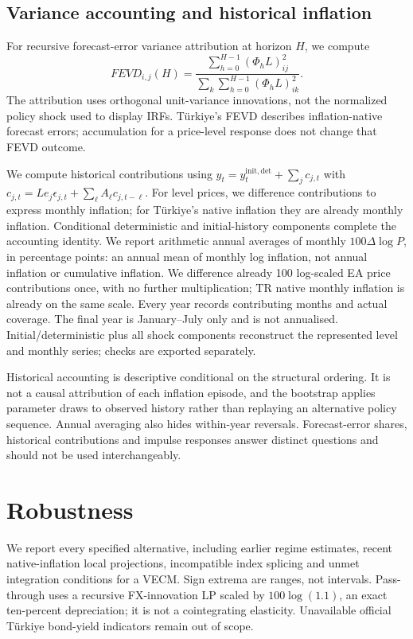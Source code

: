 \subsection{Variance accounting and historical inflation}

For recursive forecast-error variance attribution at horizon $H$, we compute
\begin{equation}
 FEVD_{i, j}(H)=\frac{\sum_{h=0}^{H-1}(\Phi_hL)_{ij}^{2}}{\sum_{k}\sum_{h=0}^{H-1}(\Phi_hL)_{ik}^{2}}.
\end{equation}
The attribution uses orthogonal unit-variance innovations, not the normalized policy shock used to display IRFs. Türkiye's FEVD describes inflation-native forecast errors; accumulation for a price-level response does not change that FEVD outcome.

We compute historical contributions using $y_t=y_t^{\mathrm{init, det}}+\sum_jc_{j, t}$ with $c_{j, t}=Le_j\epsilon_{j, t}+\sum_\ell A_\ell c_{j, t-\ell}$. For level prices, we difference contributions to express monthly inflation; for Türkiye's native inflation they are already monthly inflation. Conditional deterministic and initial-history components complete the accounting identity. We report arithmetic annual averages of monthly $100\Delta\log P$, in percentage points: an annual mean of monthly log inflation, not annual inflation or cumulative inflation. We difference already 100 log-scaled EA price contributions once, with no further multiplication; TR native monthly inflation is already on the same scale. Every year records contributing months and actual coverage. The final year is January–July only and is not annualised. Initial/deterministic plus all shock components reconstruct the represented level and monthly series; checks are exported separately.

Historical accounting is descriptive conditional on the structural ordering. It is not a causal attribution of each inflation episode, and the bootstrap applies parameter draws to observed history rather than replaying an alternative policy sequence. Annual averaging also hides within-year reversals. Forecast-error shares, historical contributions and impulse responses answer distinct questions and should not be used interchangeably.
\section{Robustness}

We report every specified alternative, including earlier regime estimates, recent native-inflation local projections, incompatible index splicing and unmet integration conditions for a VECM. Sign extrema are ranges, not intervals. Pass-through uses a recursive FX-innovation LP scaled by $100\log(1.1)$, an exact ten-percent depreciation; it is not a cointegrating elasticity. Unavailable official Türkiye bond-yield indicators remain out of scope.
